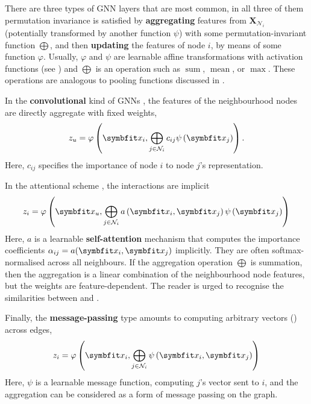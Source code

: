 There are three types of GNN layers that are most common, in all three of them permutation invariance is satisfied by \textbf{aggregating} features from $\symbf{X}_{\mathcal{N}_i}$ (potentially transformed by another function $\psi$) with some permutation-invariant function $\bigoplus$, and then \textbf{updating} the features of node $i$, by means of some function $\varphi$. Usually, $\varphi$ and $\psi$ are learnable affine transformations with activation functions (see ) and $\bigoplus$ is an operation such as $\operatorname{sum}$, $\operatorname{mean}$, or $\operatorname{max}$. These operations are analogous to pooling functions discussed in .

In the \textbf{convolutional} kind of GNNs \parencite{kipf2016semi}, the features of the neighbourhood nodes are directly aggregate with fixed weights,
\begin{equation}
    z_{u}=\varphi\left(\bfitx_{i}, \bigoplus_{j \in \mathcal{N}_{i}} c_{i j} \psi\left(\bfitx_{j}\right)\right).
    \label{eqn:gcn}
\end{equation}
Here, $c_{ij}$ specifies the importance of node $i$ to node $j$'s representation.

In the attentional scheme \parencite{velic018graph, brody2021attentive}, the interactions are implicit
\begin{equation}
z_{i}=\varphi\left(\bfitx_{u}, \bigoplus_{j \in \mathcal{N}_{i}} a\left(\bfitx_{i}, \bfitx_{j}\right) \psi\left(\bfitx_{j}\right)\right)
\label{eqn:attn-gnn}
\end{equation}
Here, $a$ is a learnable \textbf{self-attention} mechanism that computes the importance coefficients $\alpha_{ij} = a(\bfitx_i,\bfitx_j)$ implicitly. They are often softmax-normalised across all neighbours. If the aggregation operation $\bigoplus$ is summation, then the aggregation is a linear combination of the neighbourhood node features, but the weights are feature-dependent. The reader is urged to recognise the similarities between  and .

Finally, the \textbf{message-passing} type amounts to computing arbitrary vectors () across edges,
\begin{equation}
    z_{i}=\varphi\left(\bfitx_{i}, \bigoplus_{j \in \mathcal{N}_{i}} \psi\left(\bfitx_{i}, \bfitx_{j}\right)\right)
    \label{eqn:mesg-passing}
\end{equation}
Here, $\psi$ is a learnable message function, computing $j$'s vector sent to $i$, and the aggregation can be considered as a form of message passing on the graph.

